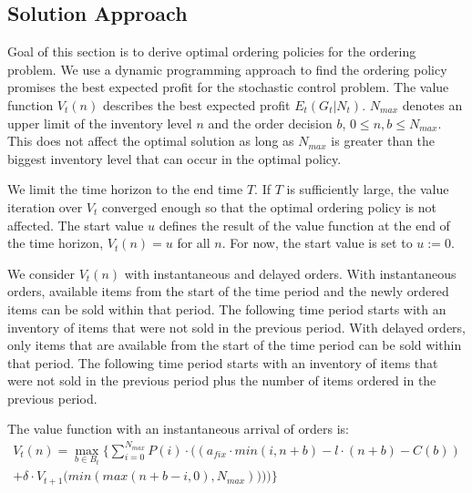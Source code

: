 \subsection{Solution Approach}
\label{section:ordering_solution}

Goal of this section is to derive optimal ordering policies for the ordering problem.
We use a dynamic programming approach to find the ordering policy promises the best expected profit for the stochastic control problem.
The value function $V_t(n)$ describes the best expected profit $E_t(G_t | N_t)$.
$N_{max}$ denotes an upper limit of the inventory level $n$ and the order decision $b$, $0 \leq n, b \leq N_{max}$. This does not affect the optimal solution as long as $N_{max}$ is greater than the biggest inventory level that can occur in the optimal policy.

We limit the time horizon to the end time $T$.
If $T$ is sufficiently large, the value iteration over $V_t$ converged enough so that the optimal ordering policy is not affected.
The start value $u$ defines the result of the value function at the end of the time horizon, $V_t(n) = u$ for all $n$.
For now, the start value is set to $u := 0$.

We consider $V_t(n)$ with instantaneous and delayed orders.
With instantaneous orders, available items from the start of the time period and the newly ordered items can be sold within that period.
The following time period starts with an inventory of items that were not sold in the previous period.
With delayed orders, only items that are available from the start of the time period can be sold within that period.
The following time period starts with an inventory of items that were not sold in the previous period plus the number of items ordered in the previous period.

The value function with an instantaneous arrival of orders is:
\begin{equation}
\begin{split}
V_t(n) = \max_{b \in B_t} \Bigg\{
\sum_{i = 0}^{N_{max}}
P(i) \cdot \Big(
(a_{fix} \cdot min(i, n + b) %
- l \cdot (n + b) %
- C(b)) %
 \\
+ \delta \cdot V_{t+1}\big(min(max(n + b - i, 0), N_{max}))\big)
\Big)\Bigg\}
\end{split}
\label{eq:dyn_prog_no_delay}
\end{equation}

